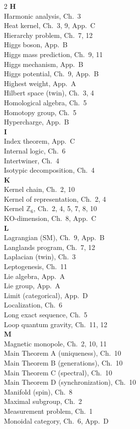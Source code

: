 \documentclass[11pt,a4paper,openright]{book}
\theoremstyle{plain}
\theoremstyle{definition}
\begin{document}
\begin{multicols}{2}
\textbf{H}\\[2pt]
Harmonic analysis, Ch.~3\\
Heat kernel, Ch.~3, 9, App.~C\\
Hierarchy problem, Ch.~7, 12\\
Higgs boson, App.~B\\
Higgs mass prediction, Ch.~9, 11\\
Higgs mechanism, App.~B\\
Higgs potential, Ch.~9, App.~B\\
Highest weight, App.~A\\
Hilbert space (twin), Ch.~3, 4\\
Homological algebra, Ch.~5\\
Homotopy group, Ch.~5\\
Hypercharge, App.~B\\[4pt]

\textbf{I}\\[2pt]
Index theorem, App.~C\\
Internal logic, Ch.~6\\
Intertwiner, Ch.~4\\
Isotypic decomposition, Ch.~4\\[4pt]

\textbf{K}\\[2pt]
Kernel chain, Ch.~2, 10\\
Kernel of representation, Ch.~2, 4\\
Kernel $\mathbb{Z}_6$, Ch.~2, 4, 5, 7, 8, 10\\
KO-dimension, Ch.~8, App.~C\\[4pt]

\textbf{L}\\[2pt]
Lagrangian (SM), Ch.~9, App.~B\\
Langlands program, Ch.~7, 12\\
Laplacian (twin), Ch.~3\\
Leptogenesis, Ch.~11\\
Lie algebra, App.~A\\
Lie group, App.~A\\
Limit (categorical), App.~D\\
Localization, Ch.~6\\
Long exact sequence, Ch.~5\\
Loop quantum gravity, Ch.~11, 12\\[4pt]

\textbf{M}\\[2pt]
Magnetic monopole, Ch.~2, 10, 11\\
Main Theorem A (uniqueness), Ch.~10\\
Main Theorem B (generations), Ch.~10\\
Main Theorem C (spectral), Ch.~10\\
Main Theorem D (synchronization), Ch.~10\\
Manifold (spin), Ch.~8\\
Maximal subgroup, Ch.~2\\
Measurement problem, Ch.~1\\
Monoidal category, Ch.~6, App.~D\\[4pt]


\end{multicols}
\end{document}
